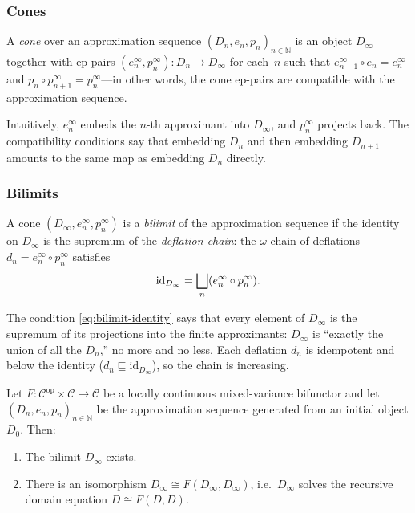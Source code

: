 \subsubsection*{Cones}

\begin{definition}
\label{def:ep-cone}
A \emph{cone} over an approximation sequence $(D_n, e_n, p_n)_{n \in
\mathbb{N}}$ is an object $D_\infty$ together with ep-pairs
$(e^\infty_n, p^\infty_n) : D_n \to D_\infty$ for each~$n$ such that
$e^\infty_{n+1} \circ e_n = e^\infty_n$ and
$p_n \circ p^\infty_{n+1} = p^\infty_n$---in other words, the cone
ep-pairs are compatible with the approximation sequence.
\end{definition}

Intuitively, $e^\infty_n$ embeds the $n$-th approximant into $D_\infty$,
and $p^\infty_n$ projects back.  The compatibility conditions say that
embedding $D_n$ and then embedding $D_{n+1}$ amounts to the same map
as embedding $D_n$ directly.

\subsubsection*{Bilimits}

\begin{definition}[Bilimit]
\label{def:bilimit}
A cone $(D_\infty, e^\infty_n, p^\infty_n)$ is a \emph{bilimit} of
the approximation sequence if the identity on $D_\infty$ is the
supremum of the \emph{deflation chain}: the $\omega$-chain of
deflations $d_n = e^\infty_n \circ p^\infty_n$ satisfies
\begin{equation}
\label{eq:bilimit-identity}
  \mathrm{id}_{D_\infty} = \bigsqcup_n (e^\infty_n \circ p^\infty_n).
\end{equation}
\end{definition}

The condition \eqref{eq:bilimit-identity} says that every element of
$D_\infty$ is the supremum of its projections into the finite
approximants: $D_\infty$ is ``exactly the union of all the $D_n$,''
no more and no less.  Each deflation $d_n$ is idempotent and
below the identity ($d_n \sqsubseteq \mathrm{id}_{D_\infty}$), so the
chain is increasing.

\begin{theorem}
\label{thm:smyth-plotkin}
Let $F : \mathcal{C}^{\mathrm{op}} \times \mathcal{C} \to
\mathcal{C}$ be a locally continuous mixed-variance bifunctor and let
$(D_n, e_n, p_n)_{n \in \mathbb{N}}$ be the approximation sequence
generated from an initial object $D_0$.  Then:
\begin{enumerate}
  \item The bilimit $D_\infty$ exists.
  \item There is an isomorphism
    $D_\infty \cong F(D_\infty, D_\infty)$,
    i.e.\ $D_\infty$ solves the recursive domain equation
    $D \cong F(D, D)$.
\end{enumerate}
\end{theorem}

